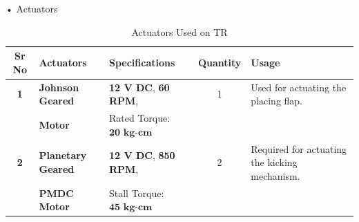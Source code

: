            •  Actuators
            \begin{table}[h]
                \caption {Actuators Used on TR} \label{Actuators_TR}  \small
                \begin{tabular}{|c|l|l|c|l|}
                    \hline  \hline
                    \textbf{Sr No}  & \textbf{Actuators}        & \textbf{Specifications}               & \textbf{Quantity}  & \textbf{Usage}                                               \\ \hline   \hline
                    \textbf{1}      & \textbf{Johnson Geared}   & \textbf{12 V DC},  \textbf{60 RPM},   & 1                  & Used for actuating the placing flap.                         \\
                                    & \textbf{Motor}            & Rated Torque: $\textbf{20 kg-cm}$     &                    &                                                              \\ \hline 
                    \textbf{2}      & \textbf{Planetary Geared} & \textbf{12 V DC},  \textbf{850 RPM},  & 2                  & Required for actuating the kicking mechanism.                \\
                                    & \textbf{PMDC Motor}       & Stall Torque: $\textbf{45 kg-cm}$     &                    &                                                              \\ \hline   \hline  
                \end{tabular}
            \end{table}


